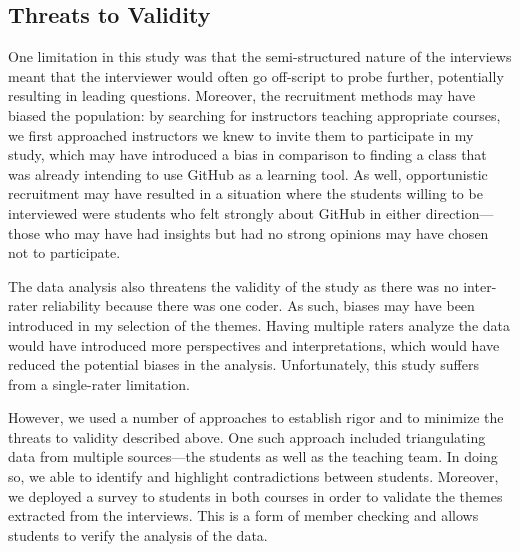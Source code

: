 \subsection{Threats to Validity}
One limitation in this study was that the semi-structured nature of the interviews meant that the interviewer would often go off-script to probe further, potentially resulting in leading questions. Moreover, the recruitment methods may have biased the population: by searching for instructors teaching appropriate courses, we first approached instructors we knew to invite them to participate in my study, which may have introduced a bias in comparison to finding a class that was already intending to use GitHub as a learning tool. As well, opportunistic recruitment may have resulted in a situation where the students willing to be interviewed were students who felt strongly about GitHub in either direction---those who may have had insights but had no strong opinions may have chosen not to participate.

The data analysis also threatens the validity of the study as there was no inter-rater reliability because there was one coder. As such, biases may have been introduced in my selection of the themes. Having multiple raters analyze the data would have introduced more perspectives and interpretations, which would have reduced the potential biases in the analysis. Unfortunately, this study suffers from a single-rater limitation.

However, we used a number of approaches\cite{runeson2012case} to establish rigor and to minimize the threats to validity described above. One such approach included triangulating data from multiple sources---the students as well as the teaching team. In doing so, we able to identify and highlight contradictions between students. Moreover, we deployed a survey to students in both courses in order to validate the themes extracted from the interviews. This is a form of member checking and allows students to verify the analysis of the data. %


